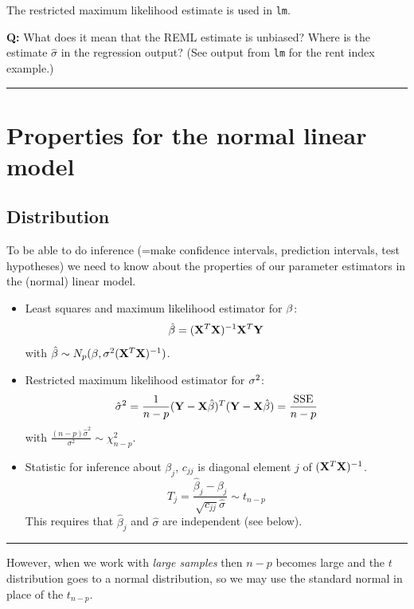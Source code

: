 \documentclass[
]{article}
\begin{document}
The restricted maximum likelihood estimate is used in \texttt{lm}.

\textbf{Q:} What does it mean that the REML estimate is unbiased? Where
is the estimate \(\hat{\sigma}\) in the regression output? (See output
from \texttt{lm} for the rent index example.)

\begin{center}\rule{0.5\linewidth}{0.5pt}\end{center}

\hypertarget{properties-for-the-normal-linear-model}{%
\section{Properties for the normal linear
model}\label{properties-for-the-normal-linear-model}}

\hypertarget{distribution}{%
\subsection{Distribution}\label{distribution}}

To be able to do inference (=make confidence intervals, prediction
intervals, test hypotheses) we need to know about the properties of our
parameter estimators in the (normal) linear model.

\begin{itemize}
\item
  Least squares and maximum likelihood estimator for \({\bf \beta}\):
  \[ \hat{\beta}=({\bf X}^T{\bf X})^{-1} {\bf X}^T {\bf Y}\] with
  \(\hat{\beta}\sim N_{p}(\beta,\sigma^2({\bf X}^T{\bf X})^{-1})\).
\item
  Restricted maximum likelihood estimator for \({\bf \sigma}^2\):
  \[ \hat{\sigma}^2=\frac{1}{n-p}({\bf Y}-{\bf X}\hat{\beta})^T({\bf Y}-{\bf X}\hat{\beta})=\frac{\text{SSE}}{n-p}\]
  with \(\frac{(n-p)\hat{\sigma}^2}{\sigma^2} \sim \chi^2_{n-p}\).
\item
  Statistic for inference about \(\beta_j\), \(c_{jj}\) is diagonal
  element \(j\) of \(({\bf X}^T{\bf X})^{-1}\).
  \[ T_j=\frac{\hat{\beta}_j-\beta_j}{\sqrt{c_{jj}}\hat{\sigma}}\sim t_{n-p}\]
  This requires that \(\hat{\beta}_j\) and \(\hat{\sigma}\) are
  independent (see below).
\end{itemize}

\begin{center}\rule{0.5\linewidth}{0.5pt}\end{center}

However, when we work with \emph{large samples} then \(n-p\) becomes
large and the \(t\) distribution goes to a normal distribution, so we
may use the standard normal in place of the \(t_{n-p}\).
\end{document}
